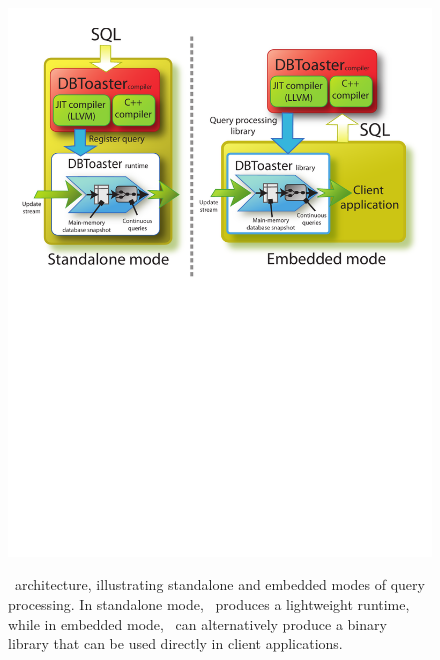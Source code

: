 \begin{figure}[tb]
\includegraphics[scale=0.42]{figures/dbt-arch.pdf}
\label{fig:dbtarch}

\vspace{-6mm}

\caption{\compiler\ architecture, illustrating standalone and embedded modes of
query processing. In standalone mode, \compiler\ produces a lightweight
runtime, while in embedded mode, \compiler\ can alternatively produce a binary
library that can be used directly in client applications.}

\vspace{-4mm}

\end{figure}

\smallskip

